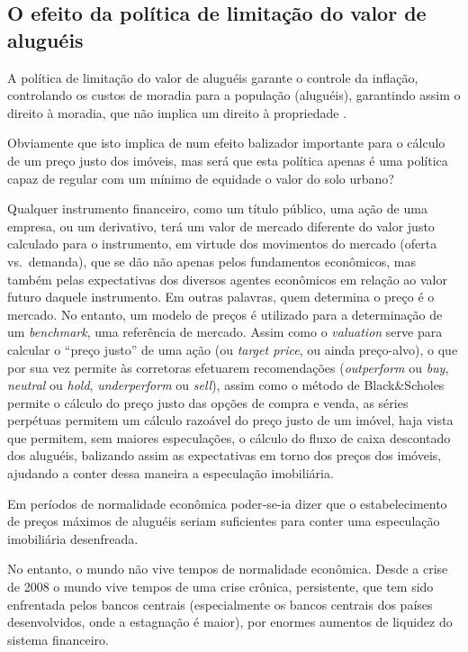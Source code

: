 \documentclass[
	12pt,				%
	oneside,			%
	a4paper,			%
	chapter=TITLE,		%
	section=TITLE,		%
	english,			%
	brazil				%
	]{abntex2}
\begin{document}
\subsection{O efeito da política de limitação do valor de
aluguéis}\label{o-efeito-da-poluxedtica-de-limitauxe7uxe3o-do-valor-de-aluguuxe9is}

A política de limitação do valor de aluguéis garante o controle da
inflação, controlando os custos de moradia para a população (aluguéis),
garantindo assim o direito à moradia, que não implica um direito à
propriedade \autocite{fnogueira}.

Obviamente que isto implica de num efeito balizador importante para o
cálculo de um preço justo dos imóveis, mas será que esta política apenas
é uma política capaz de regular com um mínimo de equidade o valor do
solo urbano?

Qualquer instrumento financeiro, como um título público, uma ação de uma
empresa, ou um derivativo, terá um valor de mercado diferente do valor
justo calculado para o instrumento, em virtude dos movimentos do mercado
(oferta vs.~demanda), que se dão não apenas pelos fundamentos
econômicos, mas também pelas expectativas dos diversos agentes
econômicos em relação ao valor futuro daquele instrumento. Em outras
palavras, quem determina o preço é o mercado. No entanto, um modelo de
preços é utilizado para a determinação de um \emph{benchmark}, uma
referência de mercado. Assim como o \emph{valuation} serve para calcular
o ``preço justo'' de uma ação (ou \emph{target price}, ou ainda
preço-alvo), o que por sua vez permite às corretoras efetuarem
recomendações (\emph{outperform} ou \emph{buy}, \emph{neutral} ou
\emph{hold}, \emph{underperform} ou \emph{sell}), assim como o método de
Black\&Scholes \autocite{marins2} permite o cálculo do preço justo das
opções de compra e venda, as séries perpétuas permitem um cálculo
razoável do preço justo de um imóvel, haja vista que permitem, sem
maiores especulações, o cálculo do fluxo de caixa descontado dos
aluguéis, balizando assim as expectativas em torno dos preços dos
imóveis, ajudando a conter dessa maneira a especulação imobiliária.

Em períodos de normalidade econômica poder-se-ia dizer que o
estabelecimento de preços máximos de aluguéis seriam suficientes para
conter uma especulação imobiliária desenfreada.

No entanto, o mundo não vive tempos de normalidade econômica. Desde a
crise de 2008 o mundo vive tempos de uma crise crônica, persistente, que
tem sido enfrentada pelos bancos centrais (especialmente os bancos
centrais dos países desenvolvidos, onde a estagnação é maior), por
enormes aumentos de liquidez do sistema financeiro.
\end{document}
